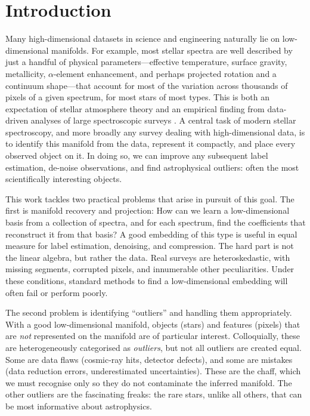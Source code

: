 \documentclass[onecolumn,floatfix,linenumbers,trackchanges]{aastex631}
\begin{document}
\section{Introduction}

Many high-dimensional datasets in science and engineering naturally lie on low-dimensional manifolds. For example, most stellar spectra are well described by just a handful of physical parameters---effective temperature, surface gravity, metallicity, $\alpha$-element enhancement, and perhaps projected rotation and a continuum shape---that account for most of the variation across thousands of pixels of a given spectrum, for most stars of most types. This is both an expectation of stellar atmosphere theory \citep{hubeny2014} and an empirical finding from data-driven analyses of large spectroscopic surveys \citep[e.g.][]{ness2015,casey2016,price-jones2018}. A central task of modern stellar spectroscopy, and more broadly any survey dealing with high-dimensional data, is to identify this manifold from the data, represent it compactly, and place every observed  object on it. In doing so, we can improve any subsequent label estimation, de-noise  observations, and find astrophysical outliers: often the most scientifically interesting objects.

This work tackles two practical problems that arise in pursuit of this goal. The first is manifold recovery and projection: How can we learn a low-dimensional basis from a collection of spectra, and for each spectrum, find the coefficients that reconstruct it from that basis? A good embedding of this type is useful in equal measure for label estimation, denoising, and compression. The hard part is not the linear algebra, but rather the data. Real surveys are heteroskedastic, with missing segments, corrupted pixels, and innumerable other peculiarities. Under these conditions, standard methods to find a low-dimensional embedding will often fail or perform poorly.

The second problem is identifying ``outliers'' and handling them appropriately. With a good low-dimensional manifold, objects (stars) and features (pixels) that are \emph{not} represented on the manifold are of particular interest. Colloquially, these are heterogeneously categorised as \emph{outliers}, but not all outliers are created equal. Some are data flaws (cosmic-ray hits, detector defects), and some are mistakes (data reduction errors, underestimated uncertainties). These are the chaff, which we must recognise only so they do not contaminate the inferred manifold. The other outliers are the fascinating freaks: the rare stars, unlike all others, that can be most informative about astrophysics.
\end{document}
